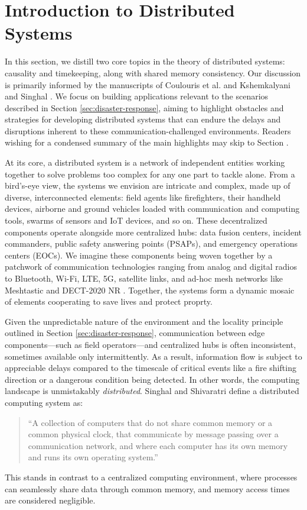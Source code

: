 \documentclass[]             %
{NASA}                       %
\theoremstyle{definition}
\begin{document}


\section{Introduction to Distributed Systems}
\label{sec:background}
In this section, we distill two core topics in the theory of
distributed systems: causality and timekeeping, along with shared
memory consistency.  Our discussion is primarily informed by the
manuscripts of Coulouris et al.  \cite{coulouris2005distributed} and
Kshemkalyani and Singhal \cite{kshemkalyani_singhal_2008}. We focus on
building applications relevant to the scenarios described in Section
\ref{sec:disaster-response}, aiming to highlight obstacles and
strategies for developing distributed systems that can endure the
delays and disruptions inherent to these communication-challenged
environments. Readers wishing for a condensed summary of the main
highlights may skip to Section \label{ssec:background-summary}.

At its core, a distributed system is a network of independent entities
working together to solve problems too complex for any one part to
tackle alone. From a bird’s-eye view, the systems we envision are
intricate and complex, made up of diverse, interconnected elements:
field agents like firefighters, their handheld devices, airborne and
ground vehicles loaded with communication and computing tools, swarms
of sensors and IoT devices, and so on. These decentralized components
operate alongside more centralized hubs: data fusion centers, incident
commanders, public safety answering points (PSAPs), and emergency
operations centers (EOCs). We imagine these components being woven
together by a patchwork of communication technologies ranging from
analog and digital radios to Bluetooth, Wi-Fi, LTE, 5G, satellite
links, and ad-hoc mesh networks like Meshtastic \citationneeded and
DECT-2020 NR \citationneeded. Together, the systems form a dynamic
mosaic of elements cooperating to save lives and protect proprty.

Given the unpredictable nature of the environment and the locality
principle outlined in Section \ref{sec:disaster-response},
communication between edge components---such as field operators---and
centralized hubs is often inconsistent, sometimes available only
intermittently. As a result, information flow is subject to
appreciable delays compared to the timescale of critical events like a
fire shifting direction or a dangerous condition being detected. In
other words, the computing landscape is unmistakably
\emph{distributed}. Singhal and Shivaratri \cite{10.5555/562065}
define a distributed computing system as:
\begin{quote}
  ``A collection of computers that do not share common
  memory or a common physical clock, that communicate by message
  passing over a communication network, and where each computer has
  its own memory and runs its own operating system.''
\end{quote}
This stands in contrast to a centralized computing environment, where
processes can seamlessly share data through common memory, and memory
access times are considered negligible.
\end{document}
